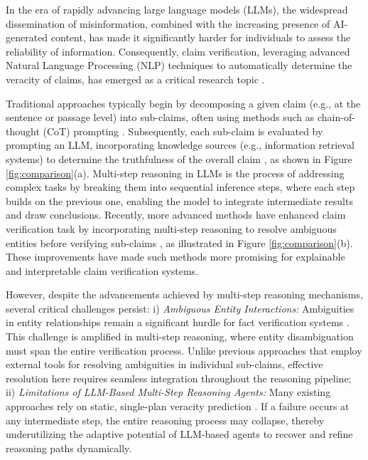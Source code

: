 \documentclass[11pt]{article}
\begin{document}
In the era of rapidly advancing large language models (LLMs), the widespread dissemination of misinformation, combined with the increasing presence of AI-generated content, has made it significantly harder for individuals to assess the reliability of information. Consequently, claim verification, leveraging advanced Natural Language Processing (NLP) techniques to automatically determine the veracity of claims, has emerged as a critical research topic \cite{fact_check_survey, abs-2408-14317}.

Traditional approaches typically begin by decomposing a given claim (e.g., at the sentence or passage level) into sub-claims, often using methods such as chain-of-thought (CoT) prompting \cite{Wei0SBIXCLZ22}. Subsequently, each sub-claim is evaluated by prompting an LLM, incorporating knowledge sources (e.g., information retrieval systems) to determine the truthfulness of the overall claim \cite{Krishna0022, ZhangG23}, as shown in Figure \ref{fig:comparison}(a). Multi-step reasoning in LLMs is the process of addressing complex tasks by breaking them into sequential inference steps, where each step builds on the previous one, enabling the model to integrate intermediate results and draw conclusions. Recently, more advanced methods have enhanced claim verification task by incorporating multi-step reasoning to resolve ambiguous entities before verifying sub-claims \cite{WangS23a, program_fc, ZhaoWWCZW24}, as illustrated in Figure \ref{fig:comparison}(b). These improvements have made such methods more promising for explainable and interpretable claim verification systems.

However, despite the advancements achieved by multi-step reasoning mechanisms, several critical challenges persist: i) \textit{Ambiguous Entity Interactions:} Ambiguities in entity relationships remain a significant hurdle for fact verification systems \cite{sedova2024knowknowanalyzingselfconsistency}. This challenge is amplified in multi-step reasoning, where entity disambiguation must span the entire verification process. Unlike previous approaches that employ external tools for resolving ambiguities in individual sub-claims, effective resolution here requires seamless integration throughout the reasoning pipeline; ii) \textit{Limitations of LLM-Based Multi-Step Reasoning Agents:} Many existing approaches rely on static, single-plan veracity prediction \cite{program_fc, WangS23a}. If a failure occurs at any intermediate step, the entire reasoning process may collapse, thereby underutilizing the adaptive potential of LLM-based agents to recover and refine reasoning paths dynamically.
\end{document}
